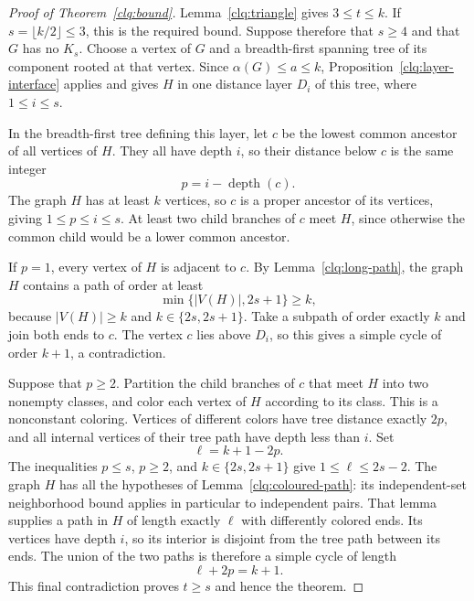 \begin{proof}[Proof of Theorem~\ref{clq:bound}]
Lemma~\ref{clq:triangle} gives $3\le t\le k$.
If $s=\lfloor k/2\rfloor\le3$, this is the required bound.
Suppose therefore that $s\ge4$ and that $G$ has no $K_s$.
Choose a vertex of $G$ and a breadth-first spanning tree of its
component rooted at that vertex.  Since $\alpha(G)\le a\le k$,
Proposition~\ref{clq:layer-interface} applies and gives $H$ in one
distance layer $D_i$ of this tree, where $1\le i\le s$.

In the breadth-first tree defining this layer, let $c$ be the lowest
common ancestor of all vertices of $H$.
They all have depth $i$, so their distance below $c$ is the same
integer
\[
 p=i-\operatorname{depth}(c).
\]
The graph $H$ has at least $k$ vertices, so $c$ is a proper
ancestor of its vertices, giving $1\le p\le i\le s$.
At least two child branches of $c$ meet $H$, since otherwise the
common child would be a lower common ancestor.

If $p=1$, every vertex of $H$ is adjacent to $c$.
By Lemma~\ref{clq:long-path}, the graph $H$ contains a path of
order at least
\[
 \min\{|V(H)|,2s+1\}\ge k,
\]
because $|V(H)|\ge k$ and $k\in\{2s,2s+1\}$.
Take a subpath of order exactly $k$ and join both ends to $c$.
The vertex $c$ lies above $D_i$, so this gives a simple cycle of
order $k+1$, a contradiction.

Suppose that $p\ge2$.  Partition the child branches of $c$ that
meet $H$ into two nonempty classes, and color each vertex of $H$
according to its class.  This is a nonconstant coloring.
Vertices of different colors have tree distance exactly $2p$,
and all internal vertices of their tree path have depth less than
$i$.
Set
\[
 \ell=k+1-2p.
\]
The inequalities $p\le s$, $p\ge2$, and
$k\in\{2s,2s+1\}$ give $1\le\ell\le2s-2$.
The graph $H$ has all the hypotheses of
Lemma~\ref{clq:coloured-path}: its independent-set neighborhood
bound applies in particular to independent pairs.
That lemma supplies a path in $H$ of length exactly $\ell$
with differently colored ends.
Its vertices have depth $i$, so its interior is disjoint from
the tree path between its ends.  The union of the two paths is
therefore a simple cycle of length
\[
 \ell+2p=k+1.
\]
This final contradiction proves $t\ge s$ and hence the theorem.
\end{proof}
